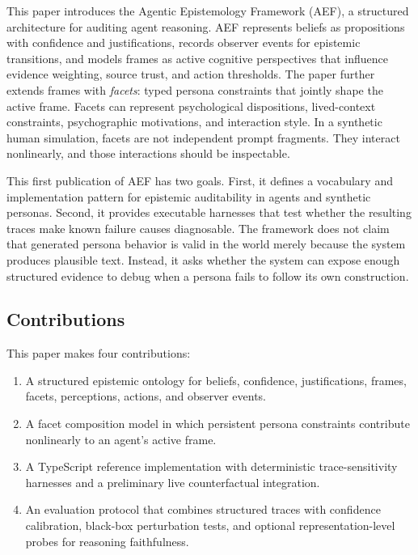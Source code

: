 \documentclass[10pt,a4paper]{article}
\newcommand{\method}{AEF}
\begin{document}
This paper introduces the Agentic Epistemology Framework (\method), a structured architecture for auditing agent reasoning. \method{} represents beliefs as propositions with confidence and justifications, records observer events for epistemic transitions, and models frames as active cognitive perspectives that influence evidence weighting, source trust, and action thresholds. The paper further extends frames with \emph{facets}: typed persona constraints that jointly shape the active frame. Facets can represent psychological dispositions, lived-context constraints, psychographic motivations, and interaction style. In a synthetic human simulation, facets are not independent prompt fragments. They interact nonlinearly, and those interactions should be inspectable.

This first publication of \method{} has two goals. First, it defines a vocabulary and implementation pattern for epistemic auditability in agents and synthetic personas. Second, it provides executable harnesses that test whether the resulting traces make known failure causes diagnosable. The framework does not claim that generated persona behavior is valid in the world merely because the system produces plausible text. Instead, it asks whether the system can expose enough structured evidence to debug when a persona fails to follow its own construction.

\subsection{Contributions}
This paper makes four contributions:
\begin{enumerate}[leftmargin=*]
  \item A structured epistemic ontology for beliefs, confidence, justifications, frames, facets, perceptions, actions, and observer events.
  \item A facet composition model in which persistent persona constraints contribute nonlinearly to an agent's active frame.
  \item A TypeScript reference implementation with deterministic trace-sensitivity harnesses and a preliminary live counterfactual integration.
  \item An evaluation protocol that combines structured traces with confidence calibration, black-box perturbation tests, and optional representation-level probes for reasoning faithfulness.
\end{enumerate}
\end{document}
